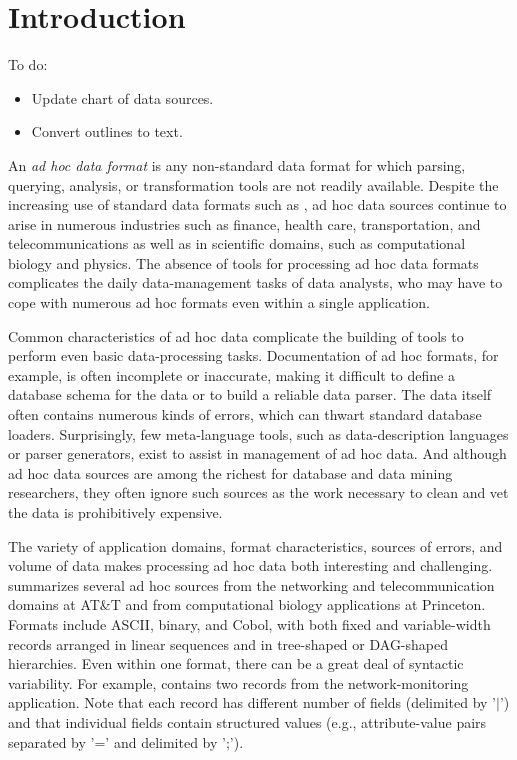 \section{Introduction}
\label{sec:intro}

To do:
\begin{itemize}
\item Update chart of data sources.
\item Convert outlines to text.
\end{itemize}


An {\em ad hoc data format} is any non-standard data format for which
parsing, querying, analysis, or transformation tools are not readily
available.  Despite the increasing use of standard data formats such
as \xml{}, ad hoc data sources continue to arise in numerous
industries such as finance, health care, transportation, and
telecommunications as well as in scientific domains, such as
computational biology and physics.  The absence of tools for
processing ad hoc data formats complicates the daily data-management
tasks of data analysts, who may have to cope with numerous ad
hoc formats even within a single application.  

Common characteristics of ad hoc data complicate the building of tools
to perform even basic data-processing tasks.  Documentation of ad hoc
formats, for example, is often incomplete or inaccurate, making it
difficult to define a database schema for the data or to build a
reliable data parser.  The data itself often contains numerous kinds
of errors, which can thwart standard database loaders.  Surprisingly,
few meta-language tools, such as data-description languages or parser
generators, exist to assist in management of ad hoc data.  And
although ad hoc data sources are among the richest for database and
data mining researchers, they often ignore such sources as the work
necessary to clean and vet the data is prohibitively expensive.


The variety of application domains, format characteristics, sources of
errors, and volume of data makes processing ad hoc data both
interesting and challenging.   summarizes
several ad hoc sources from the networking and telecommunication
domains at AT\&T and from computational biology applications at
Princeton.  Formats include ASCII, binary, and Cobol, with both fixed
and variable-width records arranged in linear sequences and in
tree-shaped or DAG-shaped hierarchies.  Even within one format, there
can be a great deal of syntactic variability.  For example,
 contains two records from the
network-monitoring application.  Note that each record has different
number of fields (delimited by '$|$') and that individual fields contain
structured values (e.g., attribute-value pairs separated by '=' and
delimited by ';').

